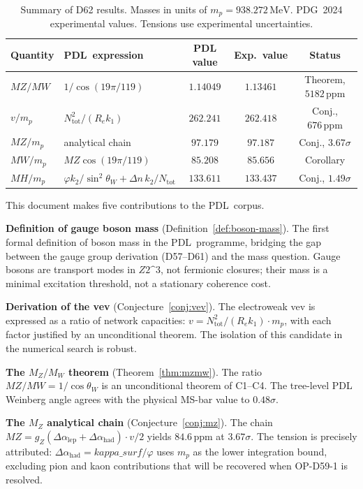 \documentclass[12pt,a4paper]{article}
\theoremstyle{remark}
\newcommand{\PDL}{\textsc{pdl}}
\newcommand{\Ztwo}{\mathbb{Z}_{2}^{3}}
\newcommand{\ksurf}{\kappa_{\mathrm{surf}}}
\newcommand{\Ntot}{N_{\mathrm{tot}}}
\newcommand{\sinthW}{\sin^{2}\!\theta_{W}}
\newcommand{\cosW}{\cos\theta_{W}}
\newcommand{\Dalep}{\Delta\alpha_{\mathrm{lep}}}
\newcommand{\Dahad}{\Delta\alpha_{\mathrm{had}}}
\newcommand{\MZ}{M_{Z}}
\newcommand{\MW}{M_{W}}
\newcommand{\MH}{M_{H}}
\newcommand{\vev}{v}
\newcommand{\ppm}{\,\mathrm{ppm}}
\newcommand{\MeV}{\,\mathrm{MeV}}
\newcommand{\mproton}{m_{p}}
\def\PDL{PDL}%
\def\Ztwo{Z2\^{}3}%
\def\MZ{MZ}%
\def\MW{MW}%
\def\MH{MH}%
\def\ksurf{kappa\_surf}%
\begin{document}
\begin{table}[h!]
\centering
\caption{Summary of D62 results. Masses in units of $\mproton=938.272\MeV$.
PDG~2024 experimental values. Tensions use experimental uncertainties.}
\label{tab:summary}
\renewcommand{\arraystretch}{1.35}
\begin{tabular}{p{1.5cm}p{5.0cm}ccc}
\toprule
Quantity & \PDL\ expression & PDL value & Exp.\ value & Status\\
\midrule
$\MZ/\MW$ & $1/\cos(19\pi/119)$ & $1.14049$ & $1.13461$ & Theorem, $5182\ppm$\\
$v/\mproton$ & $\Ntot^{2}/(R_{e}k_{1})$ & $262.241$ & $262.418$ & Conj., $676\ppm$\\
$\MZ/\mproton$ & analytical chain & $97.179$ & $97.187$ & Conj., $3.67\sigma$\\
$\MW/\mproton$ & $\MZ\cos(19\pi/119)$ & $85.208$ & $85.656$ & Corollary\\
$\MH/\mproton$ & $\varphi k_{2}/\sinthW+\Delta n\,k_{2}/\Ntot$ & $133.611$ & $133.437$ & Conj., $1.49\sigma$\\
\bottomrule
\end{tabular}
\end{table}

This document makes five contributions to the \PDL\ corpus.

\textbf{Definition of gauge boson mass} (Definition~\ref{def:boson-mass}).
The first formal definition of boson mass in the \PDL\ programme, bridging
the gap between the gauge group derivation (D57--D61) and the mass question.
Gauge bosons are transport modes in $\Ztwo$, not fermionic closures; their
mass is a minimal excitation threshold, not a stationary coherence cost.

\textbf{Derivation of the vev} (Conjecture~\ref{conj:vev}). The electroweak
vev is expressed as a ratio of network capacities: $\vev=\Ntot^{2}/(R_{e}k_{1})
\cdot\mproton$, with each factor justified by an unconditional theorem. The
isolation of this candidate in the numerical search is robust.

\textbf{The $M_Z/M_W$ theorem} (Theorem~\ref{thm:mzmw}). The ratio
$\MZ/\MW=1/\cosW$ is an unconditional theorem of C1--C4. The tree-level PDL
Weinberg angle agrees with the physical MS-bar value to $0.48\sigma$.

\textbf{The $M_Z$ analytical chain} (Conjecture~\ref{conj:mz}). The chain
$\MZ=g_{Z}(\Dalep+\Dahad)\cdot\vev/2$ yields $84.6\ppm$ at $3.67\sigma$.
The tension is precisely attributed: $\Dahad=\ksurf/\varphi$ uses $\mproton$
as the lower integration bound, excluding pion and kaon contributions that
will be recovered when OP-D59-1 is resolved.
\end{document}
